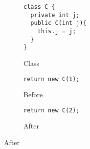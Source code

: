 \begin{figure}[tb]
\centering
\begin{subfigure}{.3\linewidth}
\begin{lstlisting}[style=refinity]
class C {
  private int j;
  public C(int j){
    this.j = j;
  }
}
\end{lstlisting}
\caption{Class}
\end{subfigure}\hspace{2mm}
\begin{subfigure}{.3\linewidth}
\begin{lstlisting}[style=refinity]
return new C(1);
\end{lstlisting}
\caption{Before}
\end{subfigure}\hspace{2mm}
\begin{subfigure}{.3\linewidth}
\begin{lstlisting}[style=refinity]
return new C(2);
\end{lstlisting}
    \caption{After}
  \end{subfigure}
\label{lst:ObjectCreation-refinity-2}
\end{figure}




